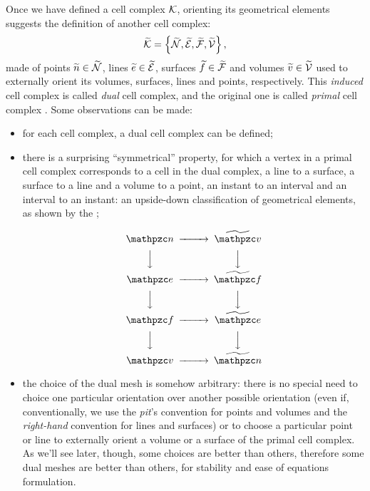 Once we have defined a cell complex $\mathcal{K}$, orienting its geometrical
elements suggests the definition of another cell complex:
\begin{equation*}
  \widetilde{\mathcal{K}} = \left\{\widetilde{\mathcal{N}}, \widetilde{\mathcal{E}},
  \widetilde{\mathcal{F}}, \widetilde{\mathcal{V}}\right\},
\end{equation*}
made of
points $\widetilde{n} \in \widetilde{\mathcal{N}}$, lines $\widetilde{e} \in
\widetilde{\mathcal{E}}$, surfaces $\widetilde{f} \in \widetilde{\mathcal{F}}$ and volumes
$\widetilde{v} \in \widetilde{\mathcal{V}}$ used to externally orient its volumes,
surfaces, lines and points, respectively. This \emph{induced} cell
complex is called \emph{dual} cell complex, and the original one is
called \emph{primal} cell complex \cite{tonti_formulazione}. Some
observations can be made:
\begin{itemize}
\item
  for each cell complex, a dual cell complex can be defined;
\item
  there is a surprising ``symmetrical'' property, for which a vertex
  in a primal cell complex corresponds to a cell in the dual complex, a
  line to a surface, a surface to a line and a volume to a point, an
  instant to an interval and an interval to an instant: an upside-down
  classification of geometrical elements, as shown by the
  ;  

  \begin{equation} \label{dia:dual_mesh_symmetry}
    \begin{CD}
      \Point{n}   @>>> \ExtOrient{\Volume{v}} \\
      @VVV             @VVV \\
      \Line{e}    @>>> \ExtOrient{\Surface{f}} \\
      @VVV             @VVV \\
      \Surface{f} @>>> \ExtOrient{\Line{e}} \\
      @VVV             @VVV \\
      \Volume{v}  @>>> \ExtOrient{\Point{n}} \\
    \end{CD}
  \end{equation}
  
\item
  the choice of the dual mesh is somehow arbitrary: there is no special
  need to choice one particular orientation over another possible
  orientation (even if, conventionally, we use the \emph{pit}'s convention
  for points and volumes and the \emph{right-hand} convention for
  lines and surfaces) or to choose a particular point or line to
  externally orient a volume or a surface of the primal cell
  complex. As we'll see later, though, some choices are better than
  others, therefore some dual meshes are better than others, for
  stability and ease of equations formulation.
\end{itemize}

